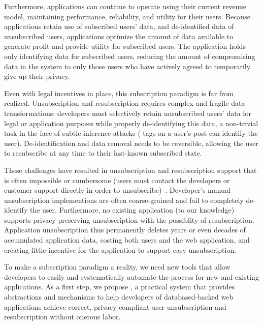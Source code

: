 Furthermore, applications can continue to operate using their current revenue model, maintaining
performance, reliability, and utility for their users.  Because applications retain use of
subscribed users' data, and de-identified data of unsubscribed users, applications optimize the
amount of data available to generate profit and provide utility for subscribed users. The
application holds only identifying data for subscribed users, reducing the amount of
compromising data in the system to only those users who have actively agreed to temporarily give up
their privacy.

Even with legal incentives in place, this subscription paradigm is far from realized.
Unsubscription and resubscription requires complex and fragile data transformations: 
developers must selectively retain unsubscribed users' data for legal or application purposes while
properly de-identifying this data, a non-trivial task in the face of subtle inference attacks (\eg
tags on a user's post can identify the user). De-identification and data removal needs to be
reversible, allowing the user to resubscribe at any time to their last-known subscribed state.

These challenges have resulted in unsubscription and resubscription support that is often impossible
or cumbersome (users must contact the developers or customer support directly in order to
unsubscribe)~\cite{jdm}.  Developer's manual unsubscription implementions are often coarse-grained
and fail to completely de-identify the user. Furthermore, no existing application (to our knowledge)
supports privacy-preserving unsubscription with the possiblity of resubscription. Application
unsubscription thus permanently deletes years or even decades of accumulated application data,
costing both users and the web application, and creating little incentive for the application to
support easy unsubscription. 

To make a subscription paradigm a reality, we need new tools that allow developers to easily and
systematically automate the process for new and existing applications. As a first step, we propose
\sys, a practical system that provides abstractions and mechanisms to help developers of databased-backed web
applications achieve correct, privacy-compliant user unsubscription and resubscription without
onerous labor.

